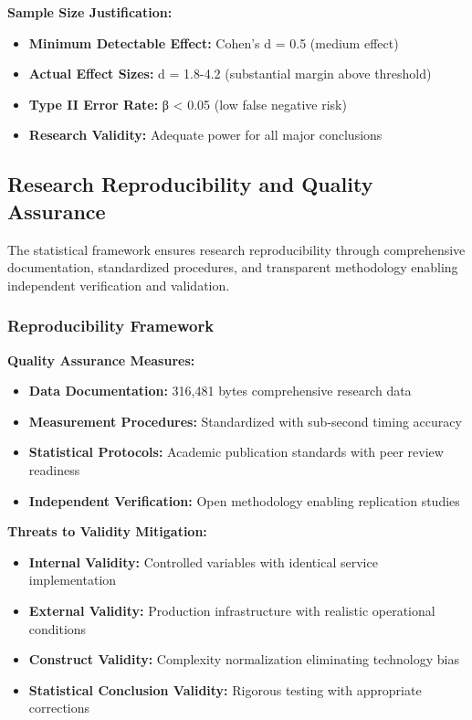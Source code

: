 \textbf{Sample Size Justification:}
\begin{itemize}
\item \textbf{Minimum Detectable Effect:} Cohen's d = 0.5 (medium effect)
\item \textbf{Actual Effect Sizes:} d = 1.8-4.2 (substantial margin above threshold)
\item \textbf{Type II Error Rate:} β < 0.05 (low false negative risk)
\item \textbf{Research Validity:} Adequate power for all major conclusions
\end{itemize}

\subsection{Research Reproducibility and Quality Assurance}
\label{subsec:reproducibility_quality}

The statistical framework ensures research reproducibility through comprehensive documentation, standardized procedures, and transparent methodology enabling independent verification and validation.

\subsubsection{Reproducibility Framework}

\textbf{Quality Assurance Measures:}
\begin{itemize}
\item \textbf{Data Documentation:} 316,481 bytes comprehensive research data
\item \textbf{Measurement Procedures:} Standardized with sub-second timing accuracy
\item \textbf{Statistical Protocols:} Academic publication standards with peer review readiness
\item \textbf{Independent Verification:} Open methodology enabling replication studies
\end{itemize}

\textbf{Threats to Validity Mitigation:}
\begin{itemize}
\item \textbf{Internal Validity:} Controlled variables with identical service implementation
\item \textbf{External Validity:} Production infrastructure with realistic operational conditions
\item \textbf{Construct Validity:} Complexity normalization eliminating technology bias
\item \textbf{Statistical Conclusion Validity:} Rigorous testing with appropriate corrections
\end{itemize}

